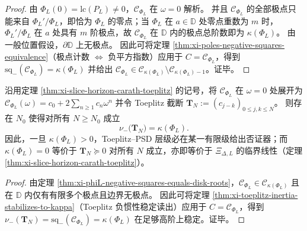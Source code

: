 \begin{proof}
由 \(\Phi_L(0)=\mathrm{lc}(P_L)\neq 0\)，\(\mathscr{C}_{\Phi_L}\) 在 \(\omega=0\) 解析。
并且 \(\mathscr{C}_{\Phi_L}\) 的全部极点只能来自 \(\Phi_L'/\Phi_L\)，即恰为 \(\Phi_L\) 的零点；当 \(\Phi_L\) 在 \(a\in\mathbb{D}\) 处零点重数为 \(m\) 时，\(\Phi_L'/\Phi_L\) 在 \(a\) 处具有 \(m\) 阶极点，故 \(\mathscr{C}_{\Phi_L}\) 在 \(\mathbb{D}\) 内的极点总阶数即为 \(\kappa(\Phi_L)\)。
由一般位置假设，\(\partial\mathbb{D}\) 上无极点。
因此可将定理 \ref{thm:xi-poles-negative-squares-equivalence}（极点计数 \(\Longleftrightarrow\) 负平方指数）应用于 \(C=\mathscr{C}_{\Phi_L}\)，得到 \(\mathrm{sq}_-(\mathscr{C}_{\Phi_L})=\kappa(\Phi_L)\) 并给出 \(\mathscr{C}_{\Phi_L}\in\mathcal{C}_{\kappa(\Phi_L)}\setminus\mathcal{C}_{\kappa(\Phi_L)-1}\)。证毕。
\end{proof}

\begin{corollary}\label{cor:xi-phiL-toeplitz-inertia-stabilizes}
沿用定理 \ref{thm:xi-slice-horizon-carath-toeplitz} 的记号，将 \(\mathscr{C}_{\Phi_L}\) 在 \(\omega=0\) 处展开为
\(
\mathscr{C}_{\Phi_L}(\omega)=c_0+2\sum_{n\ge 1}c_n\omega^n
\)
并令 Toeplitz 截断
\(
\mathbf{T}_N:=(c_{j-k})_{0\le j,k\le N}
\)。
则存在 \(N_0\) 使得对所有 \(N\ge N_0\) 成立
\[
\boxed{\;
\nu_-\!\bigl(\mathbf{T}_N\bigr)=\kappa(\Phi_L).\;}
\]
因此，一旦 \(\kappa(\Phi_L)>0\)，Toeplitz--PSD 层级必在某一有限级给出否证器；而 \(\kappa(\Phi_L)=0\) 等价于 \(\mathbf{T}_N\succeq 0\) 对所有 \(N\) 成立，亦即等价于 \(\Xi_{\Delta,L}\) 的临界线性（定理 \ref{thm:xi-slice-horizon-carath-toeplitz}）。
\end{corollary}

\begin{proof}
由定理 \ref{thm:xi-phiL-negative-squares-equals-disk-roots}，\(\mathscr{C}_{\Phi_L}\in\mathcal{C}_{\kappa(\Phi_L)}\) 且在 \(\mathbb{D}\) 内仅有有限多个极点且边界无极点。
因此可将定理 \ref{thm:xi-toeplitz-inertia-stabilizes-to-kappa}（Toeplitz 负惯性稳定读出）应用于 \(C=\mathscr{C}_{\Phi_L}\)，得到 \(\nu_-(\mathbf{T}_N)=\mathrm{sq}_-(\mathscr{C}_{\Phi_L})=\kappa(\Phi_L)\) 在足够高阶上稳定。证毕。
\end{proof}

